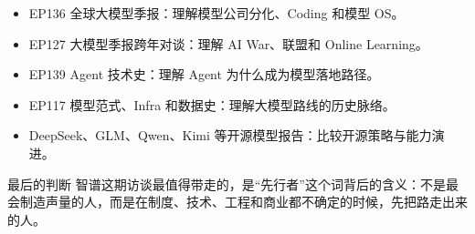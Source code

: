 \documentclass[a4paper]{article}
\begin{document}
\begin{itemize}
\item EP136 全球大模型季报：理解模型公司分化、Coding 和模型 OS。
\item EP127 大模型季报跨年对谈：理解 AI War、联盟和 Online Learning。
\item EP139 Agent 技术史：理解 Agent 为什么成为模型落地路径。
\item EP117 模型范式、Infra 和数据史：理解大模型路线的历史脉络。
\item DeepSeek、GLM、Qwen、Kimi 等开源模型报告：比较开源策略与能力演进。
\end{itemize}

\begin{importantbox}{最后的判断}
智谱这期访谈最值得带走的，是“先行者”这个词背后的含义：不是最会制造声量的人，而是在制度、技术、工程和商业都不确定的时候，先把路走出来的人。
\end{importantbox}
\end{document}

